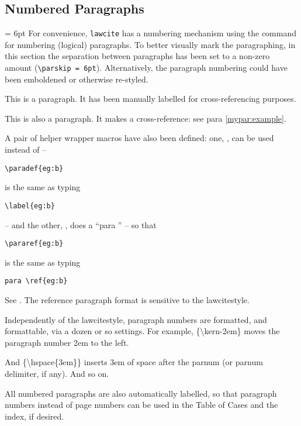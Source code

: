 \subsection{Numbered Paragraphs}
{\parskip = 6pt%
\p For convenience, \texttt{lawcite} has a numbering mechanism using the  command for numbering (logical) paragraphs. To better visually mark the paragraphing, in this section the separation between paragraphs has been set to a non-zero amount (\texttt{\textbackslash parskip = 6pt}). Alternatively, the paragraph numbering could have been emboldened or otherwise re-styled.

\p This is a paragraph. \label{mypar:example} It has been manually labelled for cross-referencing purposes.

\p This is also a paragraph. It makes a cross-reference: see para \ref{mypar:example}.

\p A pair of helper wrapper macros have also been defined: one, , can be used instead of  -- 

{\centering

\texttt{\textbackslash paradef\{eg:b\}}

}

is the same as typing 

{\centering

\texttt{\textbackslash label\{eg:b\}}

} 

-- and the other, , does a ``para '' -- so that 

{\centering

\texttt{\textbackslash pararef\{eg:b\}}

}

 is the same as typing 
 
 {\centering
 
 \texttt{para \textbackslash ref\{eg:b\}}
 
 }

\p See . The reference paragraph format is sensitive to the lawcitestyle.

\setnumparshiftleft{\kern-2em}
\p Independently of the lawcitestyle, paragraph numbers are formatted, and formattable, via a dozen or so settings. For example, \{\textbackslash kern-2em\} moves the paragraph number 2em to the left.

\setnumparfillright{\hspace{3em}}
\p And \{\textbackslash hspace\{3em\}\} inserts 3em of space after the parnum (or parnum delimiter, if any). And so on.

\p All numbered paragraphs are also automatically labelled, so that paragraph numbers instead of page numbers can be used in the Table of Cases and the index, if desired.
}%


